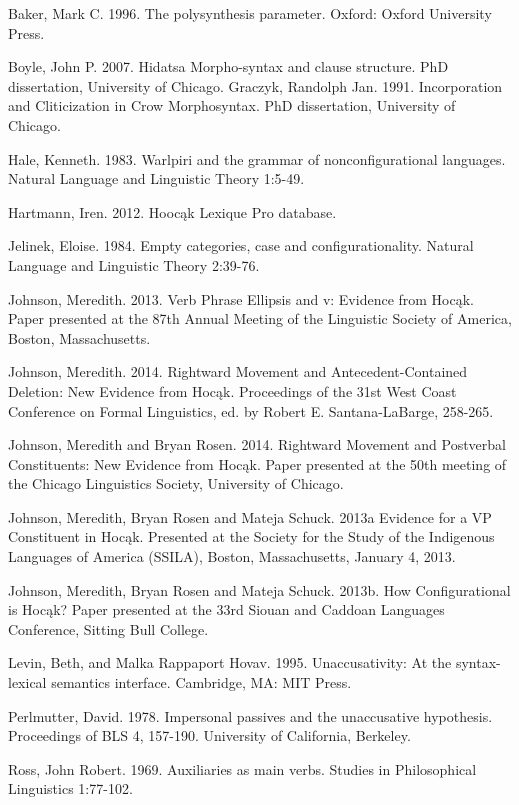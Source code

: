 \documentclass[output=paper]{LSP/langsci}
\begin{document}
\begin{reflist}

Baker, Mark C. 1996. The polysynthesis parameter. Oxford: Oxford University Press.

Boyle, John P. 2007. Hidatsa Morpho-syntax and clause structure. PhD dissertation, University of Chicago.
Graczyk, Randolph Jan. 1991. Incorporation and Cliticization in Crow Morphosyntax. PhD dissertation, University of Chicago.

Hale, Kenneth. 1983. Warlpiri and the grammar of nonconfigurational languages. Natural Language and Linguistic Theory 1:5-49.

Hartmann, Iren. 2012. Hooc\k{a}k Lexique Pro database.

Jelinek, Eloise. 1984. Empty categories, case and configurationality. Natural Language and Linguistic Theory 2:39-76.

Johnson, Meredith. 2013. Verb Phrase Ellipsis and v: Evidence from Hoc\k{a}k. Paper presented at the 87th Annual Meeting of the Linguistic Society of America, Boston, Massachusetts. 

Johnson, Meredith. 2014. Rightward Movement and Antecedent-Contained Deletion: New Evidence from Hoc\k{a}k. Proceedings of the 31st West Coast Conference on Formal Linguistics, ed. by Robert E. Santana-LaBarge, 258-265.

Johnson, Meredith and Bryan Rosen. 2014. Rightward Movement and Postverbal Constituents: New Evidence from Hoc\k{a}k. Paper presented at the 50th meeting of the Chicago Linguistics Society, University of Chicago.

Johnson, Meredith, Bryan Rosen and Mateja Schuck. 2013a Evidence for a VP Constituent in Hoc\k{a}k. Presented at the Society for the Study of the Indigenous Languages of America (SSILA), Boston, Massachusetts, January 4, 2013.

Johnson, Meredith, Bryan Rosen and Mateja Schuck. 2013b. How Configurational is Hoc\k{a}k? Paper presented at the 33rd Siouan and Caddoan Languages Conference, Sitting Bull College.

Levin, Beth, and Malka Rappaport Hovav. 1995. Unaccusativity: At the syntax-lexical semantics interface. Cambridge, MA: MIT Press.

Perlmutter, David. 1978. Impersonal passives and the unaccusative hypothesis.  Proceedings of BLS 4, 157-190. University of California, Berkeley.

Ross, John Robert. 1969. Auxiliaries as main verbs. Studies in Philosophical Linguistics 1:77-102.


\end{reflist}
\end{document}
